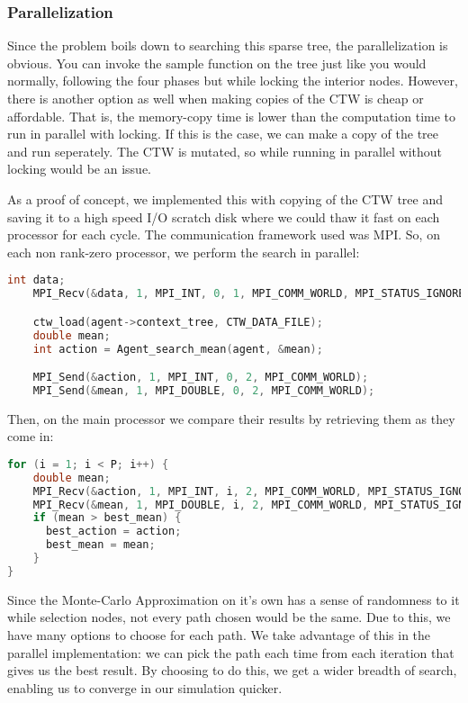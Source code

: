\documentclass[fancychapters]{report}   	%
\begin{document}
\subsubsection{Parallelization}

Since the problem boils down to searching this sparse tree, the parallelization is obvious. You can invoke the sample function on the tree just like you would normally, following the four phases but while locking the interior nodes. However, there is another option as well when making copies of the CTW  is cheap or affordable. That is, the memory-copy time is lower than the computation time to run in parallel with locking. If this is the case, we can make a copy of the tree and run seperately. The CTW is mutated, so while running in parallel without locking would be an issue.

As a proof of concept, we implemented this with copying of the CTW tree and saving it to a high speed I/O scratch disk where we could thaw it fast on each processor for each cycle. The communication framework used was MPI. So, on each non rank-zero processor, we perform the search in parallel:

\begin{lstlisting}[language=C, caption="Parallel Search"]
    int data;
    MPI_Recv(&data, 1, MPI_INT, 0, 1, MPI_COMM_WORLD, MPI_STATUS_IGNORE);

    ctw_load(agent->context_tree, CTW_DATA_FILE);
    double mean;
    int action = Agent_search_mean(agent, &mean);

    MPI_Send(&action, 1, MPI_INT, 0, 2, MPI_COMM_WORLD);
    MPI_Send(&mean, 1, MPI_DOUBLE, 0, 2, MPI_COMM_WORLD);
\end{lstlisting}

Then, on the main processor we compare their results by retrieving them as they come in:

\begin{lstlisting}[language=C]
for (i = 1; i < P; i++) {
	double mean;
	MPI_Recv(&action, 1, MPI_INT, i, 2, MPI_COMM_WORLD, MPI_STATUS_IGNORE);
	MPI_Recv(&mean, 1, MPI_DOUBLE, i, 2, MPI_COMM_WORLD, MPI_STATUS_IGNORE);
	if (mean > best_mean) {
	  best_action = action;
	  best_mean = mean;
	}
}
\end{lstlisting}

Since the Monte-Carlo Approximation on it's own has a sense of randomness to it while selection nodes, not every path chosen would be the same. Due to this, we have many options to choose for each path. We take advantage of this in the parallel implementation: we can pick the path each time from each iteration that gives us the best result. By choosing to do this, we get a wider breadth of search, enabling us to converge in our simulation quicker.
\end{document}
